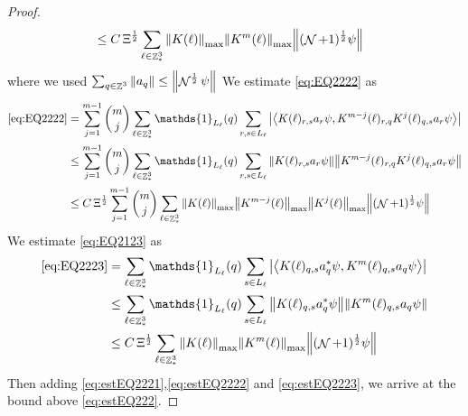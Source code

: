 \documentclass[sn-mathphys, Numbered ,a4paper]{sn-jnl}%
\DeclareMathOperator{\Z}{\mathbb{Z}}
\DeclareMathOperator{\NN}{\mathcal{N}}
\newcommand{\half}{\frac{1}{2}}
\newcommand{\eva}[1]{\left\langle #1 \right\rangle}
\theoremstyle{plain}
\theoremstyle{definition}
\theoremstyle{remark}
\theoremstyle{plain}
\theoremstyle{definition}
\theoremstyle{remark}
\begin{document}
\begin{proof}
\begin{align}
	&\leq C\,\Xi^\half \sum\limits_{\ell \in \Z^3_*} \norm{K(\ell)}_{\mathrm{max}} \norm{K^m(\ell)}_{\mathrm{max}}  \norm{  (\NN+1)^\half \psi}\label{eq:estEQ2221}
\end{align}
where we used $\sum_{q\in\Z^3}\norm{a_q}\leq \norm{\NN^\half\psi}$ 
We estimate \eqref{eq:EQ2222} as
\begin{align}
	\eqref{eq:EQ2222}
	&=\sum\limits_{j=1}^{m-1} {{m}\choose j} \sum\limits_{\ell \in \Z^3_*}\mathds{1}_{L_{\ell}}(q) \sum\limits_{r,s\in L_{\ell}}  \abs{\eva{ K(\ell)_{r,s} a_{r}\psi, K^{m-j}(\ell)_{r,q} K^{j}(\ell)_{q,s} a_{r} \psi }}\nonumber\\
	&\leq \sum\limits_{j=1}^{m-1} {{m}\choose j} \sum\limits_{\ell \in \Z^3_*}\mathds{1}_{L_{\ell}}(q) \sum\limits_{r,s\in L_{\ell}}  \norm{ K(\ell)_{r,s} a_{r}\psi}\norm{ K^{m-j}(\ell)_{r,q} K^{j}(\ell)_{q,s} a_{r} \psi } \nonumber\\
	&\leq C\,\Xi^\half \sum\limits_{j=1}^{m-1} {{m}\choose j} \sum\limits_{\ell \in \Z^3_*} \norm{K(\ell)}_{\mathrm{max}} \norm{K^{m-j}(\ell)}_{\mathrm{max}} \norm{K^j(\ell)}_{\mathrm{max}} \norm{(\NN+1)^\half \psi} \label{eq:estEQ2222}
\end{align}
We estimate \eqref{eq:EQ2123} as 
\begin{align}
	\eqref{eq:EQ2223}
	&=\sum\limits_{\ell \in \Z^3_*} \mathds{1}_{L_{\ell}}(q) \sum\limits_{ s \in L_{\ell}} \abs{\eva{K(\ell)_{q,s} a^*_{q} \psi, K^m(\ell)_{q,s}  a_{q} \psi }} \nonumber\\
	&\leq \sum\limits_{\ell \in \Z^3_*} \mathds{1}_{L_{\ell}}(q) \sum\limits_{ s \in L_{\ell}} \norm{K(\ell)_{q,s} a^*_{q} \psi}\norm{ K^m(\ell)_{q,s}  a_{q} \psi } \nonumber\\
	&\leq C\,\Xi^\half \sum\limits_{\ell \in \Z^3_*} \norm{K(\ell)}_{\mathrm{max}} \norm{K^m(\ell)}_{\mathrm{max}}  \norm{  (\NN+1)^\half \psi}\label{eq:estEQ2223}
\end{align} 
Then adding \eqref{eq:estEQ2221},\eqref{eq:estEQ2222} and \eqref{eq:estEQ2223}, we arrive at the bound above \eqref{eq:estEQ222}. 
\end{proof}
\end{document}
